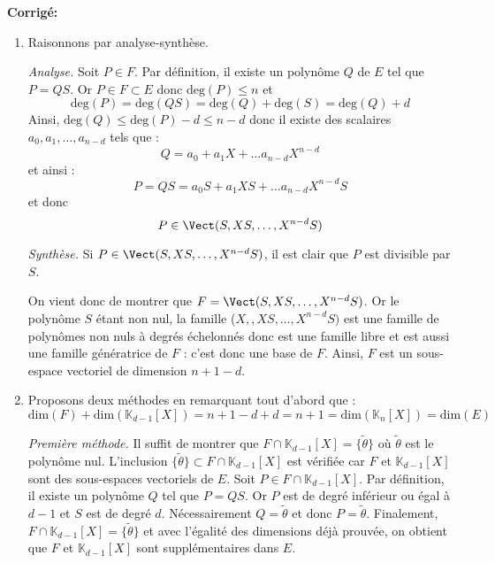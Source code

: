 \documentclass[a4paper,twoside,french,10pt]{VcCours}
\newcommand{\corr}{\textbf{Corrigé:}}
\begin{document}
\corr \begin{enumerate}
\item Raisonnons par analyse-synthèse.

\medskip

\textit{Analyse.} Soit $P \in F$. Par définition, il existe un polynôme $Q$ de $E$ tel que $P=QS$. Or $P \in F \subset E$ donc $\textrm{deg}(P) \leq n$ et 
$$ \textrm{deg}(P) = \textrm{deg}(QS) = \textrm{deg}(Q) + \textrm{deg}(S) = \textrm{deg}(Q) + d$$
Ainsi, $\textrm{deg}(Q) \leq \textrm{deg}(P) - d \leq n-d$ donc il existe des scalaires $a_0, a_1, \ldots, a_{n-d}$ tels que :
$$ Q = a_0 + a_1X+ \ldots a_{n-d} X^{n-d}$$
et ainsi :
$$ P = QS = a_0 S + a_1XS+ \ldots a_{n-d} X^{n-d}S$$
et donc 
$$ P \in \Vect(S,XS,\ldots, X^{n-d}S)$$

\medskip

\textit{Synthèse.} Si $P \in \Vect(S,XS,\ldots, X^{n-d}S)$, il est clair que $P$ est divisible par $S$.

\medskip

On vient donc de montrer que $F= \Vect(S,XS,\ldots, X^{n-d}S)$. Or le polynôme $S$ étant non nul, la famille ($X,,XS,\ldots, X^{n-d}S)$ est une famille de polynômes non nuls à degrés échelonnés donc est une famille libre et est aussi une famille génératrice de $F$ : c'est donc une base de $F$. Ainsi, $F$ est un sous-espace vectoriel de dimension $n+1-d$.
\item Proposons deux méthodes en remarquant tout d'abord que :
$$ \textrm{dim}(F) + \textrm{dim}(\mathbb{K}_{d-1}[X]) = n+1-d +d = n+1 =  \textrm{dim}(\mathbb{K}_{n}[X]) =  \textrm{dim}(E)$$

\medskip

\textit{Première méthode.}  Il suffit de montrer que $F \cap \mathbb{K}_{d-1}[X] =\lbrace \tilde{\theta} \rbrace$ où $\tilde{\theta}$ est le polynôme nul. L'inclusion  $\lbrace \tilde{\theta} \rbrace \subset F \cap \mathbb{K}_{d-1}[X]$ est vérifiée car $F$ et $\mathbb{K}_{d-1}[X]$ sont des sous-espaces vectoriels de $E$. Soit $P \in F \cap \mathbb{K}_{d-1}[X]$. Par définition, il existe un polynôme $Q$ tel que $P = QS$. Or $P$ est de degré inférieur ou égal à $d-1$ et $S$ est de degré $d$. Nécessairement $Q= \tilde{\theta}$ et donc $P= \tilde{\theta}$. Finalement, $F \cap \mathbb{K}_{d-1}[X] = \lbrace  \tilde{\theta} \rbrace$ et avec l'égalité des dimensions déjà prouvée, on obtient que $F$ et $\mathbb{K}_{d-1}[X]$ sont supplémentaires dans $E$.

\medskip


\end{enumerate}
\end{document}
